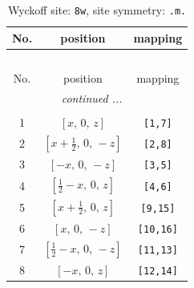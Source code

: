 \documentclass[fleqn,8pt]{jsarticle}
\begin{document}
\begin{longtable}{ccc}
\caption{Wyckoff site: {\tt 8w}, site symmetry: {\tt .m.}}
 \\
 \hline \hline
No. & position & mapping \\ \hline \endfirsthead

\multicolumn{2}{l}{\tablename\ \thetable{}} \\
 \hline \hline
No. & position & mapping \\ \hline \endhead

 \hline \hline
\multicolumn{2}{r}{\footnotesize\it continued ...} \\ \endfoot

 \hline \hline
\multicolumn{2}{r}{} \\ \endlastfoot

1 & $\left[ x,\, 0,\, z \right]$ & {\tt [1,7]} \\ \hline
2 & $\left[ x + \frac{1}{2},\, 0,\, - z \right]$ & {\tt [2,8]} \\ \hline
3 & $\left[ - x,\, 0,\, - z \right]$ & {\tt [3,5]} \\ \hline
4 & $\left[ \frac{1}{2} - x,\, 0,\, z \right]$ & {\tt [4,6]} \\ \hline
5 & $\left[ x + \frac{1}{2},\, 0,\, z \right]$ & {\tt [9,15]} \\ \hline
6 & $\left[ x,\, 0,\, - z \right]$ & {\tt [10,16]} \\ \hline
7 & $\left[ \frac{1}{2} - x,\, 0,\, - z \right]$ & {\tt [11,13]} \\ \hline
8 & $\left[ - x,\, 0,\, z \right]$ & {\tt [12,14]} \\
\end{longtable}
\renewcommand{\arraystretch}{1.2}
\end{document}
